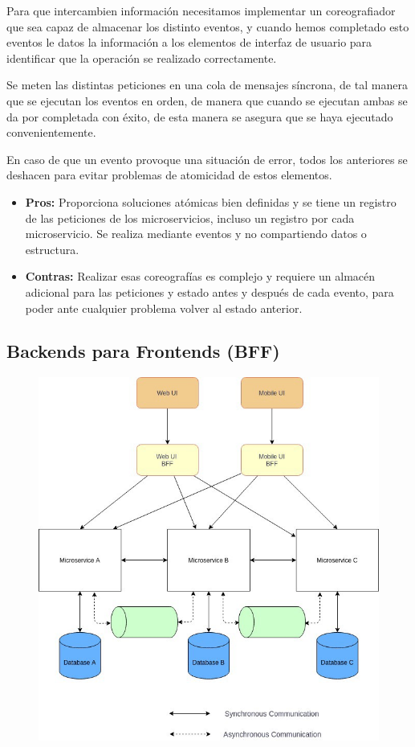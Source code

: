 \documentclass[12pt]{report} %
\begin{document}
Para que intercambien información necesitamos implementar un coreografiador que sea capaz de almacenar los distinto eventos, y cuando hemos completado esto eventos le datos la información a los elementos de interfaz de usuario para identificar que la operación se realizado correctamente.

Se meten las distintas peticiones en una cola de mensajes síncrona, de tal manera que se ejecutan los eventos en orden, de manera que cuando se ejecutan ambas se da por completada con éxito, de esta manera se asegura que se haya ejecutado convenientemente.

En caso de que un evento provoque una situación de error, todos los anteriores se deshacen para evitar problemas de atomicidad de estos elementos.
\begin{itemize}
	\item \textbf{Pros:} Proporciona soluciones atómicas bien definidas y se tiene un registro de las peticiones de los microservicios, incluso un registro por cada microservicio. Se realiza mediante eventos y no compartiendo datos o estructura.
	\item \textbf{Contras:} Realizar esas coreografías es complejo y requiere un almacén adicional para las peticiones y estado antes y después de cada evento,  para poder ante cualquier problema volver al estado anterior.
\end{itemize}		

\subsection{Backends para Frontends (BFF)}
\begin{figure}[H]
	{\includegraphics[scale=.3]{1_FCZRcAuSLhrNOjcq1zYXDw.jpeg}}
\end{figure}
\end{document}

